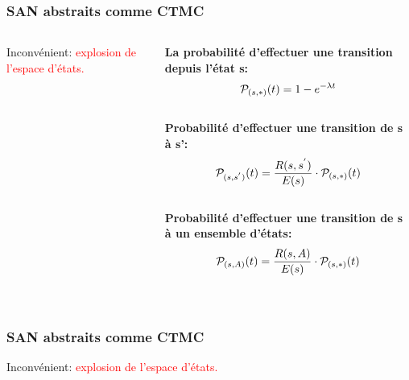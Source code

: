 
\begin{frame}
\frametitle{SAN abstraits comme CTMC}
\begin{columns}
 \begin{column}{0.5\textwidth}
 \begin{figure}[p]
\centering
\scalebox{0.25}{

}

\label{ex-bifurcations}
\end{figure}
Inconvénient: \textcolor{red}{explosion de l'espace d'états.}
  
 \end{column}
 
 \begin{column}{0.5\textwidth}
  \textbf{La probabilité d'effectuer une transition depuis l'état s:}
  $$\mathcal{P}_{{(s},{*)}} (t) = 1-e^{-\lambda t}$$ \\
  \medskip
  \textbf{Probabilité d'effectuer une transition de s à s':}
  $$\mathcal{P}_{{(s},{s^{'})}} (t) = \frac{R (s,s^{'})}{E (s)} \cdot \mathcal{P}_{{(s},{*)}} (t)$$\\
  \medskip
  \textbf{Probabilité d'effectuer une transition de s à un ensemble d'états:}
  $$\mathcal{P}_{{(s},{A)}} (t) = \frac{R (s,A)}{E (s)} \cdot \mathcal{P}_{{(s},{*)}} (t)$$ \\
 \end{column}

\end{columns}

\end{frame}

\begin{frame}
\frametitle{SAN abstraits comme CTMC}
\begin{figure}[p]
\centering
\scalebox{0.4}{

}

\label{ex-bifurcations}
\end{figure}
Inconvénient: \textcolor{red}{explosion de l'espace d'états.}
\end{frame}

